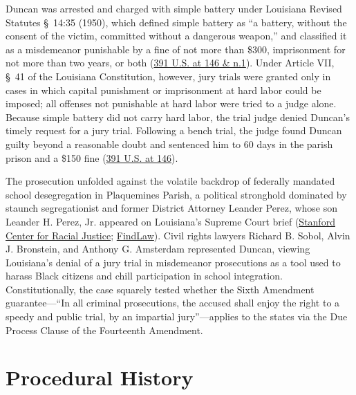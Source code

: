 \documentclass[12pt]{article}
\begin{document}
Duncan was arrested and charged with simple battery under Louisiana Revised Statutes \S~14:35 (1950), which defined simple battery as ``a battery, without the consent of the victim, committed without a dangerous weapon,'' and classified it as a misdemeanor punishable by a fine of not more than \$300, imprisonment for not more than two years, or both (\href{https://supreme.justia.com/cases/federal/us/391/145/}{391 U.S. at 146 \& n.1}). Under Article VII, \S~41 of the Louisiana Constitution, however, jury trials were granted only in cases in which capital punishment or imprisonment at hard labor could be imposed; all offenses not punishable at hard labor were tried to a judge alone. Because simple battery did not carry hard labor, the trial judge denied Duncan's timely request for a jury trial. Following a bench trial, the judge found Duncan guilty beyond a reasonable doubt and sentenced him to 60 days in the parish prison and a \$150 fine (\href{https://caselaw.findlaw.com/court/us-supreme-court/391/145.html}{391 U.S. at 146}).

The prosecution unfolded against the volatile backdrop of federally mandated school desegregation in Plaquemines Parish, a political stronghold dominated by staunch segregationist and former District Attorney Leander Perez, whose son Leander H. Perez, Jr. appeared on Louisiana's Supreme Court brief (\href{https://law.stanford.edu/2022/10/12/the-civil-rights-significance-of-duncan-v-louisiana-and-the-right-to-a-jury-trial/}{Stanford Center for Racial Justice}; \href{https://caselaw.findlaw.com/court/us-supreme-court/391/145.html}{FindLaw}). Civil rights lawyers Richard B. Sobol, Alvin J. Bronstein, and Anthony G. Amsterdam represented Duncan, viewing Louisiana's denial of a jury trial in misdemeanor prosecutions as a tool used to harass Black citizens and chill participation in school integration. Constitutionally, the case squarely tested whether the Sixth Amendment guarantee---``In all criminal prosecutions, the accused shall enjoy the right to a speedy and public trial, by an impartial jury''---applies to the states via the Due Process Clause of the Fourteenth Amendment.

\section{Procedural History}
\end{document}

